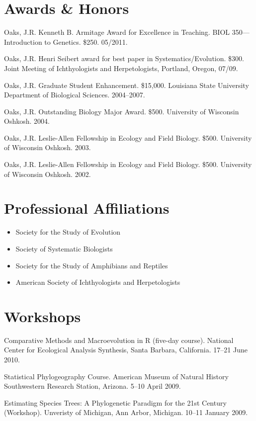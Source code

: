 \documentclass[10pt]{article}
\newenvironment{myItemize}{
  \begin{itemize}
    \setlength{\leftskip}{-4mm}
    \setlength{\itemsep}{0.25em}
    \setlength{\parskip}{0pt}
    \setlength{\parsep}{0.5em}}
  {\end{itemize}}
\newcommand{\myHangIndent}{\hangindent=5mm}
\begin{document}
\section*{Awards \& Honors}
\myHangIndent
Oaks, J.R.
Kenneth B. Armitage Award for Excellence in Teaching.
BIOL 350---Introduction to Genetics.
\$250.
05/2011.

\myHangIndent
Oaks, J.R.
Henri Seibert award for best paper in Systematics/Evolution.
\$300.
Joint Meeting of Ichthyologists and Herpetologists, Portland, Oregon, 07/09.

\myHangIndent
Oaks, J.R.
Graduate Student Enhancement.
\$15,000.
Louisiana State University Department of Biological Sciences.
2004--2007.

\myHangIndent
Oaks, J.R.
Outstanding Biology Major Award.
\$500.
University of Wisconsin Oshkosh.
2004.

\myHangIndent
Oaks, J.R.
Leslie-Allen Fellowship in Ecology and Field Biology.
\$500.
University of Wisconsin Oshkosh.
2003.

\myHangIndent
Oaks, J.R.
Leslie-Allen Fellowship in Ecology and Field Biology.
\$500.
University of Wisconsin Oshkosh.
2002.

\section*{Professional Affiliations}
\begin{myItemize}
\item Society for the Study of Evolution
\item Society of Systematic Biologists
\item Society for the Study of Amphibians and Reptiles
\item American Society of Ichthyologists and Herpetologists
\end{myItemize}

\section*{Workshops}
\myHangIndent
Comparative Methods and Macroevolution in R (five-day course).
National Center for Ecological Analysis Synthesis, Santa Barbara, California.
17--21 June 2010.

\myHangIndent
Statistical Phylogeography Course.
American Museum of Natural History Southwestern Research Station, Arizona.
5--10 April 2009.

\myHangIndent
Estimating Species Trees: A Phylogenetic Paradigm for the 21st Century (Workshop).
Unveristy of Michigan, Ann Arbor, Michigan.
10--11 January 2009.
\end{document}

